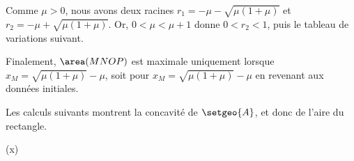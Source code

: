Comme $\mu > 0$, nous avons deux racines
$r_1 = - \mu - \sqrt{\mu (1 + \mu)}$
et
$r_2 = - \mu + \sqrt{\mu (1 + \mu)}$.
Or,
$0 < \mu < \mu + 1$
donne
$0 < r_2 < 1$,
puis
le tableau de variations suivant.
%
\begin{center}
\end{center}


Finalement,
$\area(MNOP)$ est maximale uniquement lorsque 
$x_M = \sqrt{\mu (1 + \mu)} - \mu$,
soit pour
$x_M = \sqrt{\mu (1 + \mu)} - \mu$
en revenant aux données initiales.


\begin{remark}
	Les calculs suivants montrent la concavité de $\setgeo{A}$, et donc de l'aire du rectangle.

	\begin{stepcalc}[style=sar]
    	(x)
    \explnext{}
    \explnext{}
    \explnext{}
    \end{stepcalc}
\end{remark}
